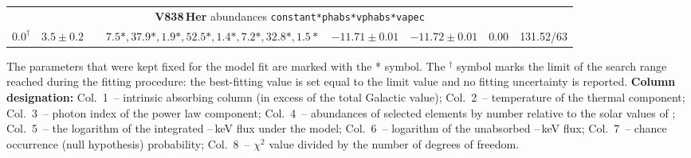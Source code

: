 \begin{table*}
\begin{tabular}{@{~}c@{~~}c@{~~}c@{~~}c@{~~}c@{~~}c@{~~}c@{~~}c@{~}}
\multicolumn{8}{c}{{\bf V838\,Her} abundances \texttt{constant*phabs*vphabs*vapec}} \\
$0.0^\dagger$ & $3.5 \pm 0.2 $ & $ $ & $7.5*, 37.9*, 1.9*, 52.5*, 1.4*, 7.2*, 32.8*, 1.5* $ & $-11.71 \pm 0.01 $ & $-11.72 \pm 0.01 $ & 0.00 & 131.52/63 \\
                \hline
        \end{tabular}
\begin{flushleft}
The parameters that were kept fixed for the model fit are marked with the \** symbol. 
The $^\dagger$ symbol marks the limit of the search range reached during
the fitting procedure: the best-fitting value is set equal to the limit value and no fitting uncertainty is reported.
{\bf Column designation:}
Col.~1~-- intrinsic absorbing column (in excess of the total Galactic value);
Col.~2~-- temperature of the thermal component;
Col.~3~-- photon index of the power law component;
Col.~4~-- abundances of selected elements by number relative to the solar values of \cite{2009ARA&A..47..481A};
Col.~5~-- the logarithm of the integrated \nustarenergylow{}--\nustarenergyhigh{}\,keV flux under the model;
Col.~6~-- logarithm of the unabsorbed \nustarenergylow{}--\nustarenergyhigh{}\,keV flux;
Col.~7~-- chance occurrence (null hypothesis) probability;
Col.~8~-- $\chi^2$ value divided by the number of degrees of freedom.

\end{flushleft}

\end{table*}
